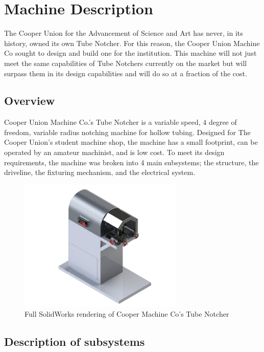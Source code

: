 \chapter{Machine Description}

The Cooper Union for the Advancement of Science and Art has never, in its history, owned its own Tube Notcher. For this reason, the Cooper Union Machine Co sought to design and build one for the institution. This machine will not just meet the same capabilities of Tube Notchers currently on the market but will surpass them in its design capabilities and will do so at a fraction of the cost.

\section{Overview}

Cooper Union Machine Co.'s Tube Notcher is a variable speed, 4 degree of freedom, variable radius notching machine for hollow tubing. Designed for The Cooper Union's student machine shop, the machine has a small footprint, can be operated by an amateur machinist, and is low cost. To meet its design requirements, the machine was broken into 4 main subsystems; the structure, the driveline, the fixturing mechanism, and the electrical system. 

\begin{figure}[H]
    \centering
    \includegraphics[width=0.7\textwidth]{./images/Chapter2-MachineDescription/FullSystemRender}
    \caption{Full SolidWorks rendering of Cooper Machine Co's Tube Notcher}
    \label{fig:FullSystemRender}
\end{figure}


\newpage

\section{Description of subsystems}

